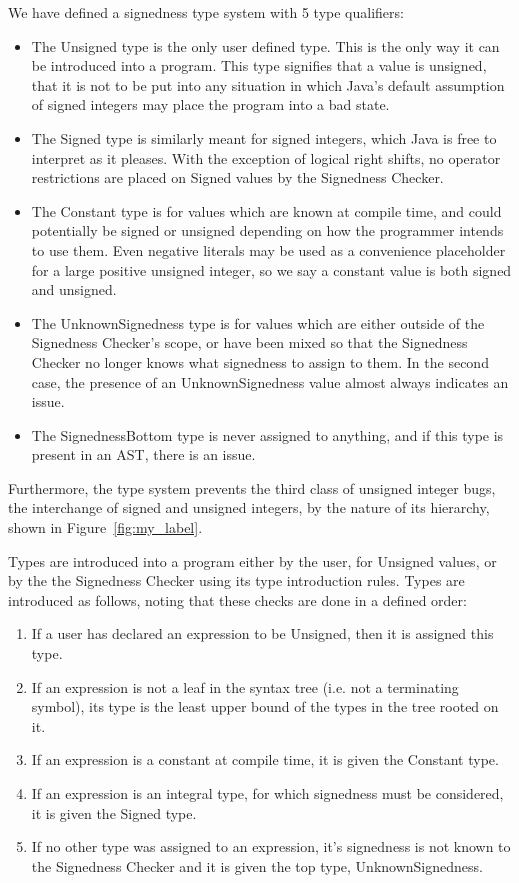 \documentclass{sig-alternate-05-2015}
\begin{document}
We have defined a signedness type system with 5 type qualifiers:

\begin{itemize}\itemsep 0pt \parskip 0pt
  \item The Unsigned type is the only user defined type. This is the only way it can be introduced into a program. This type signifies that a value is unsigned, that it is not to be put into any situation in which Java's default assumption of signed integers may place the program into a bad state.
  \item The Signed type is similarly meant for signed integers, which Java is free to interpret as it pleases. With the exception of logical right shifts, no operator restrictions are placed on Signed values by the Signedness Checker.
  \item The Constant type is for values which are known at compile time, and could potentially be signed or unsigned depending on how the programmer intends to use them. Even negative literals may be used as a convenience placeholder for a large positive unsigned integer, so we say a constant value is both signed and unsigned.
  \item The UnknownSignedness type is for values which are either outside of the Signedness Checker's scope, or have been mixed so that the Signedness Checker no longer knows what signedness to assign to them. In the second case, the presence of an UnknownSignedness value almost always indicates an issue.
  \item The SignednessBottom type is never assigned to anything, and if this type is present in an AST, there is an issue.
\end{itemize}

Furthermore, the type system prevents the third class of unsigned integer bugs, the interchange of signed and unsigned integers, by the nature of its hierarchy, shown in Figure~\ref{fig:my_label}.

Types are introduced into a program either by the user, for Unsigned values, or by the the Signedness Checker using its type introduction rules. Types are introduced as follows, noting that these checks are done in a defined order:

\begin{enumerate}\itemsep 0pt \parskip 0pt
  \item If a user has declared an expression to be Unsigned, then it is assigned this type.
  \item If an expression is not a leaf in the syntax tree (i.e. not a terminating symbol), its type is the least upper bound of the types in the tree rooted on it.
  \item If an expression is a constant at compile time, it is given the Constant type.
  \item If an expression is an integral type, for which signedness must be considered, it is given the Signed type.
  \item If no other type was assigned to an expression, it's signedness is not known to the Signedness Checker and it is given the top type, UnknownSignedness.
\end{enumerate}
\end{document}
